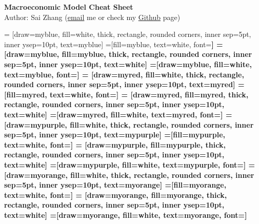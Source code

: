 \documentclass[10pt,landscape,a4paper]{article}
\begin{document}
\begin{center}{\large{\textbf{Macroeconomic Model Cheat Sheet}}}\\
Author: Sai Zhang (\href{mailto:saizhang.econ@gmail.com}{email} me or check my \href{https://github.com/SaiChrisZHANG}{Github} page)
\end{center}

\small
\begin{multicols*}{4}

 = [draw=myblue, fill=white, thick, rectangle, rounded corners, inner sep=5pt, inner ysep=10pt, text=myblue]
 =[fill=myblue, text=white, font=\bfseries]
 = [draw=myblue, fill=myblue, thick, rectangle, rounded corners, inner sep=5pt, inner ysep=10pt, text=white]
 =[draw=myblue, fill=white, text=myblue, font=\bfseries]
 = [draw=myred, fill=white, thick, rectangle, rounded corners, inner sep=5pt, inner ysep=10pt, text=myred]
 =[fill=myred, text=white, font=\bfseries]
 = [draw=myred, fill=myred, thick, rectangle, rounded corners, inner sep=5pt, inner ysep=10pt, text=white]
 =[draw=myred, fill=white, text=myred, font=\bfseries]
 = [draw=mypurple, fill=white, thick, rectangle, rounded corners, inner sep=5pt, inner ysep=10pt, text=mypurple]
 =[fill=mypurple, text=white, font=\bfseries]
 = [draw=mypurple, fill=mypurple, thick, rectangle, rounded corners, inner sep=5pt, inner ysep=10pt, text=white]
 =[draw=mypurple, fill=white, text=mypurple, font=\bfseries]
 = [draw=myorange, fill=white, thick, rectangle, rounded corners, inner sep=5pt, inner ysep=10pt, text=myorange]
 =[fill=myorange, text=white, font=\bfseries]
 = [draw=myorange, fill=myorange, thick, rectangle, rounded corners, inner sep=5pt, inner ysep=10pt, text=white]
 =[draw=myorange, fill=white, text=myorange, font=\bfseries]


\end{multicols*}
\end{document}
